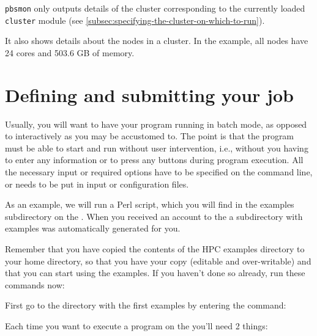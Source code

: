 \lstinline|pbsmon| only outputs details of the cluster corresponding to the
currently loaded \lstinline|cluster| module (see \autoref{subsec:specifying-the-cluster-on-which-to-run}).

It also shows details about the nodes in a cluster. In the example, all nodes have
24 cores and 503.6 GB of memory.

\fi

\section{Defining and submitting your job}
\hypertarget{sec:defining-and-submitting-job}{}

Usually, you will want to have your program running in batch mode, as opposed
to interactively as you may be accustomed to. The point is that the program
must be able to start and run without user intervention, i.e., without you
having to enter any information or to press any buttons during program
execution. All the necessary input or required options have to be specified on
the command line, or needs to be put in input or configuration files.

As an example, we will run a Perl script, which you will find in the examples
subdirectory on the \hpc. When you received an account to the \hpc a
subdirectory with examples was automatically generated for you.

Remember that you have copied the contents of the HPC examples directory to
your home directory, so that you have your  copy (editable
and over-writable) and that you can start using the examples. If you haven't
done so already, run these commands now:

\begin{prompt}
\end{prompt}

First go to the directory with the first examples by entering the command:

\begin{prompt}
\end{prompt}

Each time you want to execute a program on the \hpc you'll need 2 things:


